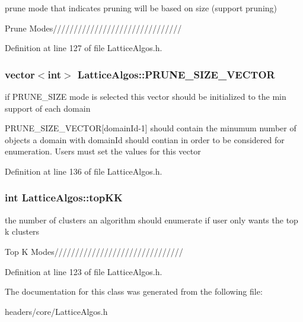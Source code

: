 prune mode that indicates pruning will be based on size (support pruning) 

Prune Modes/////////////////////////////// 

Definition at line 127 of file LatticeAlgos.h.

\hypertarget{class_lattice_algos_a244d9a63307846c2df232091a78a6759}{
\subsubsection[{PRUNE\_\-SIZE\_\-VECTOR}]{\setlength{\rightskip}{0pt plus 5cm}vector$<$int$>$ {\bf LatticeAlgos::PRUNE\_\-SIZE\_\-VECTOR}}}
\label{class_lattice_algos_a244d9a63307846c2df232091a78a6759}


if PRUNE\_\-SIZE mode is selected this vector should be initialized to the min support of each domain 

PRUNE\_\-SIZE\_\-VECTOR\mbox{[}domainId-\/1\mbox{]} should contain the minumum number of objects a domain with domainId should contian in order to be considered for enumeration. Users must set the values for this vector 

Definition at line 136 of file LatticeAlgos.h.

\hypertarget{class_lattice_algos_a90e06533d513efc4635905624283eeae}{
\subsubsection[{topKK}]{\setlength{\rightskip}{0pt plus 5cm}int {\bf LatticeAlgos::topKK}}}
\label{class_lattice_algos_a90e06533d513efc4635905624283eeae}


the number of clusters an algorithm should enumerate if user only wants the top k clusters 

Top K Modes/////////////////////////////// 

Definition at line 123 of file LatticeAlgos.h.



The documentation for this class was generated from the following file:\begin{DoxyCompactItemize}
\item 
headers/core/LatticeAlgos.h\end{DoxyCompactItemize}
